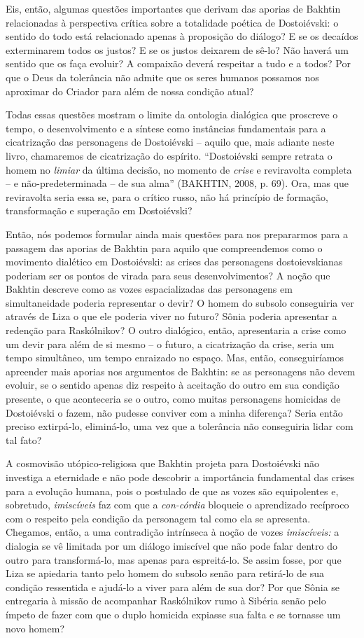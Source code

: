 Eis, então, algumas questões importantes que derivam das aporias de
Bakhtin relacionadas à perspectiva crítica sobre a totalidade poética de
Dostoiévski: o sentido do todo está relacionado apenas à proposição do
diálogo? E se os decaídos exterminarem todos os justos? E se os justos
deixarem de sê-lo? Não haverá um sentido que os faça evoluir? A
compaixão deverá respeitar a tudo e a todos? Por que o Deus da
tolerância não admite que os seres humanos possamos nos aproximar do
Criador para além de nossa condição atual?

Todas essas questões mostram o limite da ontologia dialógica que
proscreve o tempo, o desenvolvimento e a síntese como instâncias
fundamentais para a cicatrização das personagens de Dostoiévski --
aquilo que, mais adiante neste livro, chamaremos de cicatrização do
espírito. ``Dostoiévski sempre retrata o homem no \emph{limiar} da
última decisão, no momento de \emph{crise} e reviravolta completa -- e
não-predeterminada -- de sua alma'' (BAKHTIN, 2008, p. 69). Ora, mas que
reviravolta seria essa se, para o crítico russo, não há princípio de
formação, transformação e superação em Dostoiévski?

Então, nós podemos formular ainda mais questões para nos prepararmos
para a passagem das aporias de Bakhtin para aquilo que compreendemos
como o movimento dialético em Dostoiévski: as crises das personagens
dostoievskianas poderiam ser os pontos de virada para seus
desenvolvimentos? A noção que Bakhtin descreve como as vozes
espacializadas das personagens em simultaneidade poderia representar o
devir? O homem do subsolo conseguiria ver através de Liza o que ele
poderia viver no futuro? Sônia poderia apresentar a redenção para
Raskólnikov? O outro dialógico, então, apresentaria a crise como um
devir para além de si mesmo -- o futuro, a cicatrização da crise, seria
um tempo simultâneo, um tempo enraizado no espaço. Mas, então,
conseguiríamos apreender mais aporias nos argumentos de Bakhtin: se as
personagens não devem evoluir, se o sentido apenas diz respeito à
aceitação do outro em sua condição presente, o que aconteceria se o
outro, como muitas personagens homicidas de Dostoiévski o fazem, não
pudesse conviver com a minha diferença? Seria então preciso extirpá-lo,
eliminá-lo, uma vez que a tolerância não conseguiria lidar com tal fato?

A cosmovisão utópico-religiosa que Bakhtin projeta para Dostoiévski não
investiga a eternidade e não pode descobrir a importância fundamental
das crises para a evolução humana, pois o postulado de que as vozes são
equipolentes e, sobretudo, \emph{imiscíveis} faz com que a
\emph{con-córdia} bloqueie o aprendizado recíproco com o respeito pela
condição da personagem tal como ela se apresenta. Chegamos, então, a uma
contradição intrínseca à noção de vozes \emph{imiscíveis:} a dialogia se
vê limitada por um diálogo imiscível que não pode falar dentro do outro
para transformá-lo, mas apenas para espreitá-lo. Se assim fosse, por que
Liza se apiedaria tanto pelo homem do subsolo senão para retirá-lo de
sua condição ressentida e ajudá-lo a viver para além de sua dor? Por que
Sônia se entregaria à missão de acompanhar Raskólnikov rumo à Sibéria
senão pelo ímpeto de fazer com que o duplo homicida expiasse sua falta e
se tornasse um novo homem?

